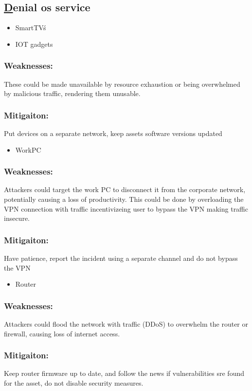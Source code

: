 \documentclass[
	letterpaper, %
	10pt, %
	unnumberedsections, %
	twoside, %
]{APAAssignment}
\begin{document}
\subsection{\underline{D}enial os service}
\begin{singlespace}

	\begin{itemize}
		\item SmartTV\'s
		\item IOT gadgets 
	\end{itemize}
	
	\subsubsection{Weaknesses:} These could be made unavailable by resource exhaustion or being overwhelmed by malicious traffic, rendering them unusable.
	\subsubsection{Mitigaiton:} Put devices on a separate network, keep assets software versions updated
	
	\begin{itemize}
		\item WorkPC
	\end{itemize}
	
	\subsubsection{Weaknesses:} Attackers could target the work PC to disconnect it from the corporate network, potentially causing a loss of productivity. This could be done by overloading the VPN connection with traffic incentivizeing user to bypass the VPN making traffic insecure.
	\subsubsection{Mitigaiton:} Have patience, report the incident using a separate channel and do not bypass the VPN

	\begin{itemize}
		\item Router
	\end{itemize}
	
	\subsubsection{Weaknesses:} Attackers could flood the network with traffic (DDoS) to overwhelm the router or firewall, causing loss of internet access.
	\subsubsection{Mitigaiton:} Keep router firmware up to date, and follow the news if vulnerabilities sre found for the asset, do not disable security measures.
	
	
\end{singlespace}
\end{document}
